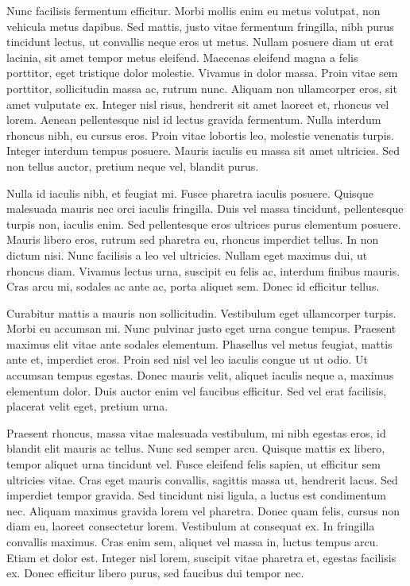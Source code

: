 Nunc facilisis fermentum efficitur. Morbi mollis enim eu metus volutpat, non vehicula metus dapibus. Sed mattis, justo vitae fermentum fringilla, nibh purus tincidunt lectus, ut convallis neque eros ut metus. Nullam posuere diam ut erat lacinia, sit amet tempor metus eleifend. Maecenas eleifend magna a felis porttitor, eget tristique dolor molestie. Vivamus in dolor massa. Proin vitae sem porttitor, sollicitudin massa ac, rutrum nunc. Aliquam non ullamcorper eros, sit amet vulputate ex. Integer nisl risus, hendrerit sit amet laoreet et, rhoncus vel lorem. Aenean pellentesque nisl id lectus gravida fermentum. Nulla interdum rhoncus nibh, eu cursus eros. Proin vitae lobortis leo, molestie venenatis turpis. Integer interdum tempus posuere. Mauris iaculis eu massa sit amet ultricies. Sed non tellus auctor, pretium neque vel, blandit purus.

Nulla id iaculis nibh, et feugiat mi. Fusce pharetra iaculis posuere. Quisque malesuada mauris nec orci iaculis fringilla. Duis vel massa tincidunt, pellentesque turpis non, iaculis enim. Sed pellentesque eros ultrices purus elementum posuere. Mauris libero eros, rutrum sed pharetra eu, rhoncus imperdiet tellus. In non dictum nisi. Nunc facilisis a leo vel ultricies. Nullam eget maximus dui, ut rhoncus diam. Vivamus lectus urna, suscipit eu felis ac, interdum finibus mauris. Cras arcu mi, sodales ac ante ac, porta aliquet sem. Donec id efficitur tellus.

Curabitur mattis a mauris non sollicitudin. Vestibulum eget ullamcorper turpis. Morbi eu accumsan mi. Nunc pulvinar justo eget urna congue tempus. Praesent maximus elit vitae ante sodales elementum. Phasellus vel metus feugiat, mattis ante et, imperdiet eros. Proin sed nisl vel leo iaculis congue ut ut odio. Ut accumsan tempus egestas. Donec mauris velit, aliquet iaculis neque a, maximus elementum dolor. Duis auctor enim vel faucibus efficitur. Sed vel erat facilisis, placerat velit eget, pretium urna.

Praesent rhoncus, massa vitae malesuada vestibulum, mi nibh egestas eros, id blandit elit mauris ac tellus. Nunc sed semper arcu. Quisque mattis ex libero, tempor aliquet urna tincidunt vel. Fusce eleifend felis sapien, ut efficitur sem ultricies vitae. Cras eget mauris convallis, sagittis massa ut, hendrerit lacus. Sed imperdiet tempor gravida. Sed tincidunt nisi ligula, a luctus est condimentum nec. Aliquam maximus gravida lorem vel pharetra. Donec quam felis, cursus non diam eu, laoreet consectetur lorem. Vestibulum at consequat ex. In fringilla convallis maximus. Cras enim sem, aliquet vel massa in, luctus tempus arcu. Etiam et dolor est. Integer nisl lorem, suscipit vitae pharetra et, egestas facilisis ex. Donec efficitur libero purus, sed faucibus dui tempor nec.

